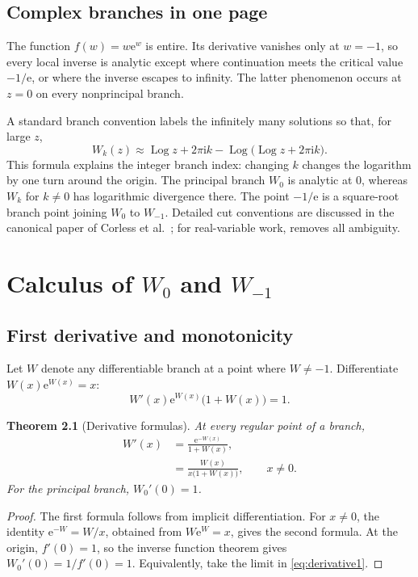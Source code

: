\documentclass[11pt,openany]{book}
\newcommand{\e}{\mathrm{e}}
\newcommand{\ii}{\mathrm{i}}
\newcommand{\Wzero}{W_0}
\DeclareMathOperator{\Log}{Log}
\theoremstyle{plain}
\newtheorem{theorem}{Theorem}[chapter]
\theoremstyle{definition}
\theoremstyle{remark}
\begin{document}
\section{Complex branches in one page}\label{sec:complexbranches}
The function \(f(w)=w\e^w\) is entire.  Its derivative vanishes only at
\(w=-1\), so every local inverse is analytic except where continuation meets the
critical value \(-1/\e\), or where the inverse escapes to infinity.  The latter
phenomenon occurs at \(z=0\) on every nonprincipal branch.

A standard branch convention labels the infinitely many solutions so that, for
large \(z\),
\[
       W_k(z)\approx \Log z+2\pi\ii k
       -\Log\bigl(\Log z+2\pi\ii k\bigr).
\]
This formula explains the integer branch index: changing \(k\) changes the
logarithm by one turn around the origin.  The principal branch \(W_0\) is analytic
at \(0\), whereas \(W_k\) for \(k\ne0\) has logarithmic divergence there.  The
point \(-1/\e\) is a square-root branch point joining \(W_0\) to \(W_{-1}\).
Detailed cut conventions are discussed in the canonical paper of Corless et
al.~\cite{Corless1996}; for real-variable work,  removes
all ambiguity.

\chapter{Calculus of \texorpdfstring{\(W_0\)}{W0} and
\texorpdfstring{\(W_{-1}\)}{W-1}}\label{chap:calculus}

\section{First derivative and monotonicity}
Let \(W\) denote any differentiable branch at a point where
\(W\ne-1\).  Differentiate \(W(x)\e^{W(x)}=x\):
\[
   W'(x)\e^{W(x)}\bigl(1+W(x)\bigr)=1.
\]

\begin{theorem}[Derivative formulas]\label{thm:derivative}
At every regular point of a branch,
\begin{align}
 W'(x)
 &=\frac{\e^{-W(x)}}{1+W(x)},\label{eq:derivative1}\\
 &=\frac{W(x)}{x\bigl(1+W(x)\bigr)},\qquad x\ne0.\label{eq:derivative2}
\end{align}
For the principal branch, \(\Wzero'(0)=1\).
\end{theorem}

\begin{proof}
The first formula follows from implicit differentiation.  For \(x\ne0\), the
identity \(\e^{-W}=W/x\), obtained from \(W\e^W=x\), gives the second formula.
At the origin, \(f'(0)=1\), so the inverse function theorem gives
\(\Wzero'(0)=1/f'(0)=1\).  Equivalently, take the limit in
\eqref{eq:derivative1}.
\end{proof}
\end{document}
